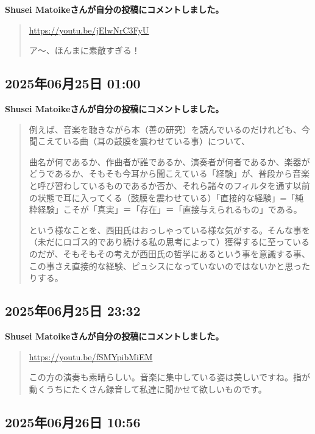 \textbf{Shusei Matoikeさんが自分の投稿にコメントしました。}

\begin{quote}
\url{https://youtu.be/jElwNrC3FyU}

ア〜、ほんまに素敵すぎる！
\end{quote}

\subsection*{2025年06月25日 01:00}

\textbf{Shusei Matoikeさんが自分の投稿にコメントしました。}

\begin{quote}
例えば、音楽を聴きながら本（善の研究）を読んでいるのだけれども、今聞こえている曲（耳の鼓膜を震わせている事）について、

曲名が何であるか、作曲者が誰であるか、演奏者が何者であるか、楽器がどうであるか、そもそも今耳から聞こえている「経験」が、普段から音楽と呼び習わしているものであるか否か、それら諸々のフィルタを通す以前の状態で耳に入ってくる（鼓膜を震わせている）「直接的な経験」=「純粋経験」こそが「真実」＝「存在」＝「直接与えられるもの」である。

という様なことを、西田氏はおっしゃっている様な気がする。そんな事を（未だにロゴス的であり続ける私の思考によって）獲得するに至っているのだが、そもそもその考えが西田氏の哲学にあるという事を意識する事、この事さえ直接的な経験、ピュシスになっていないのではないかと思ったりする。
\end{quote}

\subsection*{2025年06月25日 23:32}

\textbf{Shusei Matoikeさんが自分の投稿にコメントしました。}

\begin{quote}
\url{https://youtu.be/fSMYpibMiEM}

この方の演奏も素晴らしい。音楽に集中している姿は美しいですね。指が動くうちにたくさん録音して私達に聞かせて欲しいものです。
\end{quote}

\subsection*{2025年06月26日 10:56}

